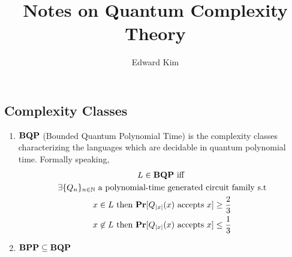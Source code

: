 \documentclass[12pt]{article}
\author{Edward Kim}
\newcommand{\papertitle}{Quantum Complexity Theory}
\begin{document}
\title{Notes on \papertitle}
\maketitle

\subsection*{Complexity Classes}

\begin{enumerate}
  \item ${\bf BQP}$ (Bounded Quantum Polynomial Time) is the complexity classes characterizing the languages which are decidable in quantum polynomial time. Formally speaking,
  \begin{gather*}
    L \in {\bf BQP} \text{ iff } \\
    \exists \{Q_n\}_{n \in \mathbb{N}} \text{ a polynomial-time generated circuit family s.t} \\
    x \in L \text{ then } {\bf Pr}[Q_{|x|}(x) \text{ accepts } x] \geq \frac{2}{3} \\
    x \not\in L \text{ then } {\bf Pr}[Q_{|x|}(x) \text{ accepts } x] \leq \frac{1}{3}
  \end{gather*}
  \item ${\bf BPP} \subseteq {\bf BQP}$
\end{enumerate}
\end{document}
